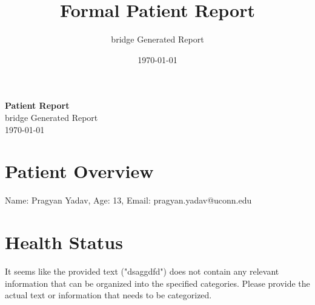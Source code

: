 \documentclass[12pt]{article}
\title{Formal Patient Report}
\author{bridge Generated Report}
\date{\today}
\begin{document}
\begin{titlepage}
    \begin{center}
        \vspace*{1in}
        {\Huge \textbf{Patient Report}} \\[2em]
        {\Large bridge Generated Report} \\[1em]
        {\large \today}
        \vfill
    \end{center}
\end{titlepage}

    
\section*{Patient Overview}
Name: Pragyan Yadav,  Age: 13, Email: pragyan.yadav@uconn.edu \\ 

\section*{Health Status}
It seems like the provided text ("dsaggdfd") does not contain any relevant information that can be organized into the specified categories. Please provide the actual text or information that needs to be categorized. \\ 


    
\end{document}
